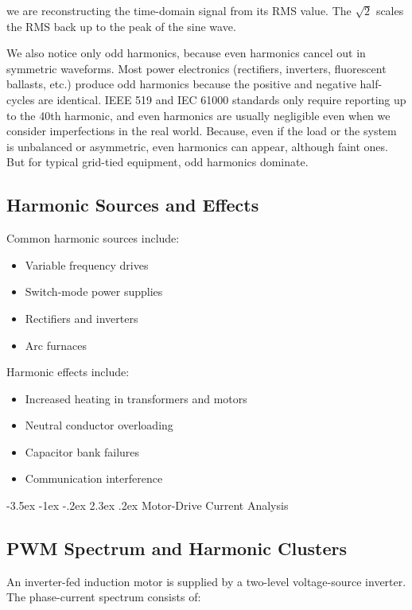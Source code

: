 \documentclass[nohyper,nobib,xcolor=dvipsnames,svgnames,x11names]{tufte-book}
\makeatletter
\renewcommand\section{\@startsection{section}{1}{\z@}%
                     {-3.5ex \@plus -1ex \@minus -.2ex}%
                     {2.3ex \@plus.2ex}%
                     {\normalfont\Large\bfseries\color{darkorange}}}
\makeatother
\begin{document}
we are reconstructing the time-domain signal from its RMS value.  The $\sqrt{2}$  scales the RMS back up to the peak of the sine wave.

We also notice only odd harmonics, because even harmonics cancel out in symmetric waveforms. Most power electronics (rectifiers, inverters, fluorescent ballasts, etc.) produce odd harmonics because the positive and negative half-cycles are identical. IEEE 519 and IEC 61000 standards only require reporting up to the 40th harmonic, and even harmonics are usually negligible even when we consider imperfections in the real world. Because, even if the load or the system is unbalanced or asymmetric, even harmonics can appear, although faint ones. But for typical grid-tied equipment, odd harmonics dominate.

\subsection{Harmonic Sources and Effects}

Common harmonic sources include:
\begin{itemize}
\item Variable frequency drives
\item Switch-mode power supplies
\item Rectifiers and inverters
\item Arc furnaces
\end{itemize}

Harmonic effects include:
\begin{itemize}
\item Increased heating in transformers and motors
\item Neutral conductor overloading
\item Capacitor bank failures
\item Communication interference
\end{itemize}

\section{Motor-Drive Current Analysis}
\subsection{PWM Spectrum and Harmonic Clusters}
An inverter-fed induction motor is supplied by a two-level voltage-source inverter.  
The phase-current spectrum consists of:
\end{document}
